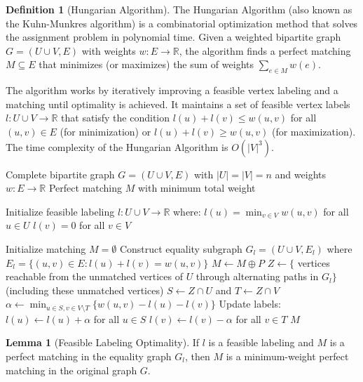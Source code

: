\documentclass{article}
\theoremstyle{definition}
\newtheorem{lemma}{Lemma}
\newtheorem{definition}{Definition}
\begin{document}
\begin{definition}[Hungarian Algorithm]
The Hungarian Algorithm (also known as the Kuhn-Munkres algorithm) is a combinatorial optimization method that solves the assignment problem in polynomial time. Given a weighted bipartite graph $G = (U \cup V, E)$ with weights $w: E \rightarrow \mathbb{R}$, the algorithm finds a perfect matching $M \subseteq E$ that minimizes (or maximizes) the sum of weights $\sum_{e \in M} w(e)$.

The algorithm works by iteratively improving a feasible vertex labeling and a matching until optimality is achieved. It maintains a set of feasible vertex labels $l: U \cup V \rightarrow \mathbb{R}$ that satisfy the condition $l(u) + l(v) \leq w(u,v)$ for all $(u,v) \in E$ (for minimization) or $l(u) + l(v) \geq w(u,v)$ (for maximization). The time complexity of the Hungarian Algorithm is $O(|V|^3)$.
\end{definition}
\begin{algorithm}[H]
\caption{Hungarian Algorithm (Minimization Version)}
\begin{algorithmic}[1]
\Require Complete bipartite graph $G = (U \cup V, E)$ with $|U| = |V| = n$ and weights $w: E \rightarrow \mathbb{R}$
\Ensure Perfect matching $M$ with minimum total weight

\State Initialize feasible labeling $l: U \cup V \rightarrow \mathbb{R}$ where:
\State $l(u) = \min_{v \in V} w(u,v)$ for all $u \in U$
\State $l(v) = 0$ for all $v \in V$

\State Initialize matching $M = \emptyset$
    \State Construct equality subgraph $G_l = (U \cup V, E_l)$ where $E_l = \{(u,v) \in E : l(u) + l(v) = w(u,v)\}$
        \State $M \gets M \oplus P$ 
    \Else
        \State $Z \gets \{$ vertices reachable from the unmatched vertices of $U$ through alternating paths in $G_l\}$ (including these unmatched vertices)
        \State $S \gets Z \cap U$ and $T \gets Z \cap V$
        \State $\alpha \gets \min_{u \in S, v \in V \setminus T} \{w(u,v) - l(u) - l(v)\}$ 
        \State Update labels:
        \State $l(u) \gets l(u) + \alpha$ for all $u \in S$
        \State $l(v) \gets l(v) - \alpha$ for all $v \in T$
    \EndIf
\EndWhile
\State \Return $M$
\end{algorithmic}
\end{algorithm}

\pagebreak
\newpage
\clearpage
\begin{lemma}[Feasible Labeling Optimality]
If $l$ is a feasible labeling and $M$ is a perfect matching in the equality graph $G_l$, then $M$ is a minimum-weight perfect matching in the original graph $G$.
\end{lemma}
\end{document}
